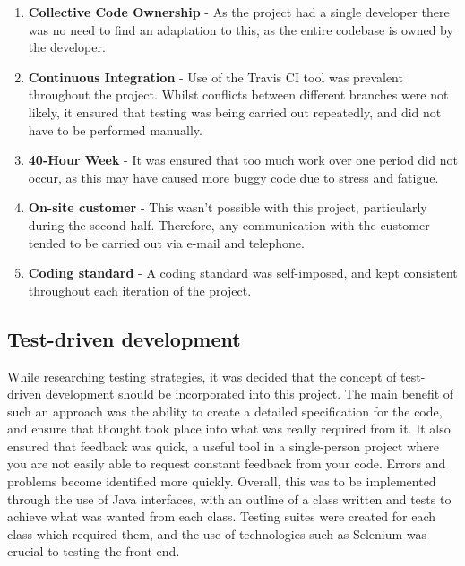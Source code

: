 \begin{enumerate}
\item	\textbf{Collective Code Ownership} - As the project had a single developer there was no need to find an adaptation to this, as the entire codebase is owned by the developer.
\item	\textbf{Continuous Integration} - Use of the Travis CI tool was prevalent throughout the project. Whilst conflicts between different branches were not likely, it ensured that testing was being carried out repeatedly, and did not have to be performed manually.
\item	\textbf{40-Hour Week} - It was ensured that too much work over one period did not occur, as this may have caused more buggy code due to stress and fatigue.
\item	\textbf{On-site customer} - This wasn't possible with this project, particularly during the second half. Therefore, any communication with the customer tended to be carried out via e-mail and telephone.
\item	\textbf{Coding standard} - A coding standard was self-imposed, and kept consistent throughout each iteration of the project.
\end{enumerate}
\subsection{Test-driven development}

While researching testing strategies, it was decided that the concept of test-driven development should be incorporated into this project. The main benefit of such an approach was the ability to create a detailed specification for the code, and ensure that thought took place into what was really required from it. It also ensured that feedback was quick, a useful tool in a single-person project where you are not easily able to request constant feedback from your code. Errors and problems become identified more quickly. Overall, this was to be implemented through the use of Java interfaces, with an outline of a class written and tests to achieve what was wanted from each class. Testing suites were created for each class which required them, and the use of technologies such as Selenium was crucial to testing the front-end.

